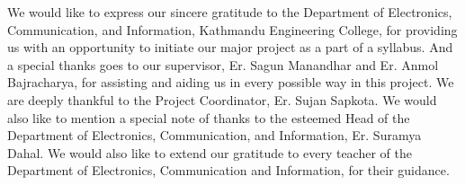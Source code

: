 We would like to express our sincere gratitude to the Department of Electronics, Communication, and Information, Kathmandu Engineering College, for providing us with an opportunity to initiate our major project as a part of a syllabus. And a special thanks goes to our supervisor, Er. Sagun Manandhar and Er. Anmol Bajracharya, for assisting and aiding us in every possible way in this project. We are deeply thankful to the Project Coordinator, Er. Sujan Sapkota. We would also like to mention a special note of thanks to the esteemed Head of the Department of Electronics, Communication, and Information, Er. Suramya Dahal. We would also like to extend our gratitude to every teacher of the Department of Electronics, Communication and Information, for their guidance.
